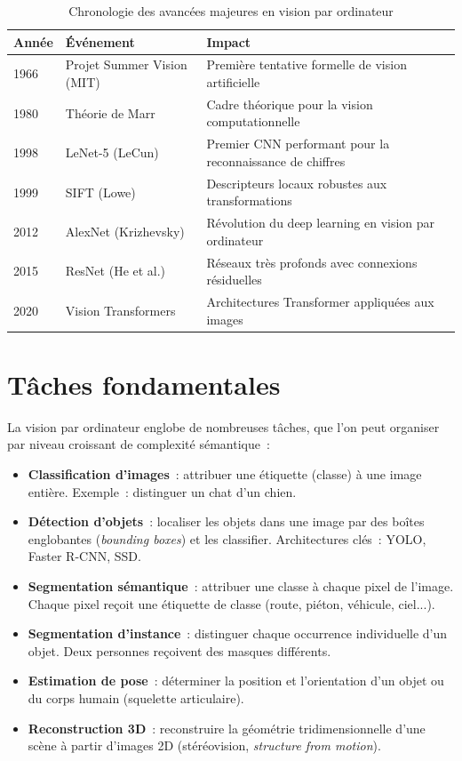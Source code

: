 \documentclass[a4paper,11pt,twoside]{book}
\begin{document}
\begin{table}[H]
\centering
\caption{Chronologie des avancées majeures en vision par ordinateur}
\begin{tabularx}{\textwidth}{l l X}
\toprule
\textbf{Année} & \textbf{Événement} & \textbf{Impact} \\
\midrule
1966 & Projet Summer Vision (MIT) & Première tentative formelle de vision artificielle \\
1980 & Théorie de Marr & Cadre théorique pour la vision computationnelle \\
1998 & LeNet-5 (LeCun) & Premier CNN performant pour la reconnaissance de chiffres \\
1999 & SIFT (Lowe) & Descripteurs locaux robustes aux transformations \\
2012 & AlexNet (Krizhevsky) & Révolution du deep learning en vision par ordinateur \\
2015 & ResNet (He et al.) & Réseaux très profonds avec connexions résiduelles \\
2020 & Vision Transformers & Architectures Transformer appliquées aux images \\
\bottomrule
\end{tabularx}
\end{table}

\section{Tâches fondamentales}

La vision par ordinateur englobe de nombreuses tâches, que l'on peut organiser par niveau croissant de complexité sémantique~:

\begin{itemize}[leftmargin=2em]
  \item \textbf{Classification d'images}~: attribuer une étiquette (classe) à une image entière. Exemple~: distinguer un chat d'un chien.
  \item \textbf{Détection d'objets}~: localiser les objets dans une image par des boîtes englobantes (\textit{bounding boxes}) et les classifier. Architectures clés~: YOLO, Faster R-CNN, SSD.
  \item \textbf{Segmentation sémantique}~: attribuer une classe à chaque pixel de l'image. Chaque pixel reçoit une étiquette de classe (route, piéton, véhicule, ciel...).
  \item \textbf{Segmentation d'instance}~: distinguer chaque occurrence individuelle d'un objet. Deux personnes reçoivent des masques différents.
  \item \textbf{Estimation de pose}~: déterminer la position et l'orientation d'un objet ou du corps humain (squelette articulaire).
  \item \textbf{Reconstruction 3D}~: reconstruire la géométrie tridimensionnelle d'une scène à partir d'images 2D (stéréovision, \textit{structure from motion}).
\end{itemize}
\end{document}
